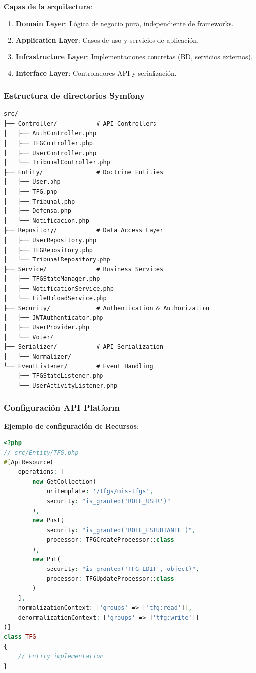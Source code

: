 \documentclass[12pt,a4paper,oneside]{report}
\providecommand{\tightlist}{%
  \setlength{\itemsep}{0pt}\setlength{\parskip}{0pt}}
\begin{document}
\textbf{Capas de la arquitectura}:

\begin{enumerate}
\def\labelenumi{\arabic{enumi}.}
\tightlist
\item
  \textbf{Domain Layer}: Lógica de negocio pura, independiente de
  frameworks.
\item
  \textbf{Application Layer}: Casos de uso y servicios de aplicación.
\item
  \textbf{Infrastructure Layer}: Implementaciones concretas (BD,
  servicios externos).
\item
  \textbf{Interface Layer}: Controladores API y serialización.
\end{enumerate}

\subsubsection{Estructura de directorios
Symfony}\label{estructura-de-directorios-symfony}

\begin{lstlisting}
src/
├── Controller/           # API Controllers
│   ├── AuthController.php
│   ├── TFGController.php
│   ├── UserController.php
│   └── TribunalController.php
├── Entity/               # Doctrine Entities
│   ├── User.php
│   ├── TFG.php
│   ├── Tribunal.php
│   ├── Defensa.php
│   └── Notificacion.php
├── Repository/           # Data Access Layer
│   ├── UserRepository.php
│   ├── TFGRepository.php
│   └── TribunalRepository.php
├── Service/              # Business Services
│   ├── TFGStateManager.php
│   ├── NotificationService.php
│   └── FileUploadService.php
├── Security/             # Authentication & Authorization
│   ├── JWTAuthenticator.php
│   ├── UserProvider.php
│   └── Voter/
├── Serializer/           # API Serialization
│   └── Normalizer/
└── EventListener/        # Event Handling
    ├── TFGStateListener.php
    └── UserActivityListener.php
\end{lstlisting}

\subsubsection{Configuración API
Platform}\label{configuraciuxf3n-api-platform}

\textbf{Ejemplo de configuración de Recursos}:

\begin{lstlisting}[language=PHP]
<?php
// src/Entity/TFG.php
#[ApiResource(
    operations: [
        new GetCollection(
            uriTemplate: '/tfgs/mis-tfgs',
            security: "is_granted('ROLE_USER')"
        ),
        new Post(
            security: "is_granted('ROLE_ESTUDIANTE')",
            processor: TFGCreateProcessor::class
        ),
        new Put(
            security: "is_granted('TFG_EDIT', object)",
            processor: TFGUpdateProcessor::class
        )
    ],
    normalizationContext: ['groups' => ['tfg:read']],
    denormalizationContext: ['groups' => ['tfg:write']]
)]
class TFG
{
    // Entity implementation
}
\end{lstlisting}
\end{document}
